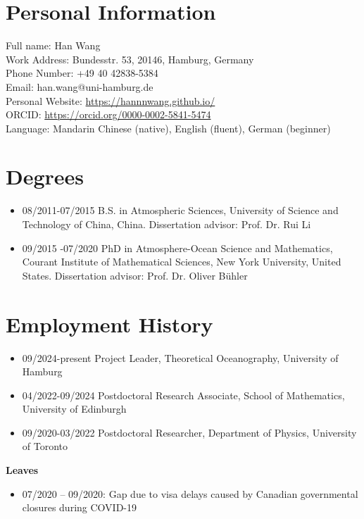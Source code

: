 \documentclass[a4paper,12pt]{article}
\begin{document}
\section{Personal Information}
Full name:  Han Wang\\
Work Address: Bundesstr. 53, 20146, Hamburg, Germany\\
Phone Number: +49 40 42838-5384 \\
Email: han.wang@uni-hamburg.de\\
Personal Website: \url{https://hannnwang.github.io/}\\
ORCID: \url{https://orcid.org/0000-0002-5841-5474}\\
Language: Mandarin Chinese (native), English (fluent), German (beginner)

\section{Degrees}
\begin{itemize}[leftmargin=*,noitemsep]
\item 08/2011-07/2015  B.S. in Atmospheric Sciences, University of Science and Technology of China,
China. Dissertation advisor: Prof. Dr. Rui Li
\item 09/2015 -07/2020   PhD in Atmosphere-Ocean Science and Mathematics, Courant Institute of Mathematical Sciences, New York University, United States. Dissertation advisor: Prof. Dr. Oliver B{\"u}hler
\end{itemize}
\section{Employment History }
\begin{itemize}[leftmargin=*,noitemsep]
\item 09/2024-present  Project Leader, Theoretical Oceanography, University of Hamburg
\item 04/2022-09/2024  Postdoctoral Research Associate, School of Mathematics, University of Edinburgh
\item 09/2020-03/2022   Postdoctoral Researcher, Department of Physics, University of Toronto
\end{itemize}
\textbf{Leaves}
\begin{itemize}[leftmargin=*,noitemsep]
\item 07/2020 – 09/2020: Gap due to visa delays caused by Canadian governmental closures during COVID-19
\end{itemize}
\end{document}
